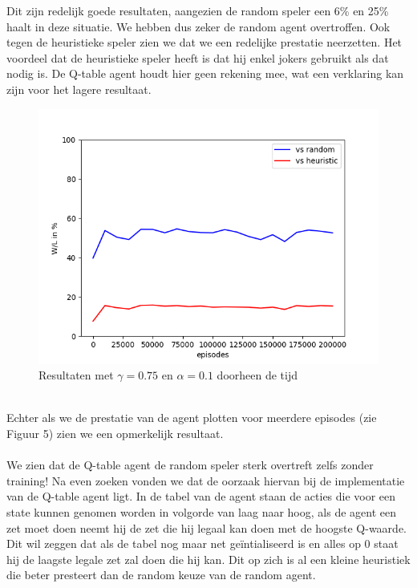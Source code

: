 \documentclass[11pt]{article}
\begin{document}
Dit zijn redelijk goede resultaten, aangezien de random speler een 6\% en 25\% haalt in deze situatie. We hebben dus zeker de random agent overtroffen. Ook tegen de heuristieke speler zien we dat we een redelijke prestatie neerzetten. Het voordeel dat de heuristieke speler heeft is dat hij enkel jokers gebruikt als dat nodig is. De Q-table agent houdt hier geen rekening mee, wat een verklaring kan zijn voor het lagere resultaat.
\begin{figure}[h]
\centering
\includegraphics[scale=0.55]{images/wins_in_time.png}
\caption{Resultaten met $\gamma = 0.75$ en $\alpha = 0.1$ doorheen de tijd}
\end{figure}\\
Echter als we de prestatie van de agent plotten voor meerdere episodes (zie Figuur 5) zien we een opmerkelijk resultaat.\\\\
We zien dat de Q-table agent de random speler sterk overtreft zelfs zonder training! Na even zoeken vonden we dat de oorzaak hiervan bij de implementatie van de Q-table agent ligt. In de tabel van de agent staan de acties die voor een state kunnen genomen worden in volgorde van laag naar hoog, als de agent een zet moet doen neemt hij de zet die hij legaal kan doen met de hoogste Q-waarde. Dit wil zeggen dat als de tabel nog maar net geïntialiseerd is en alles op 0 staat hij de laagste legale zet zal doen die hij kan. Dit op zich is al een kleine heuristiek die beter presteert dan de random keuze van de random agent.\\
\end{document}
